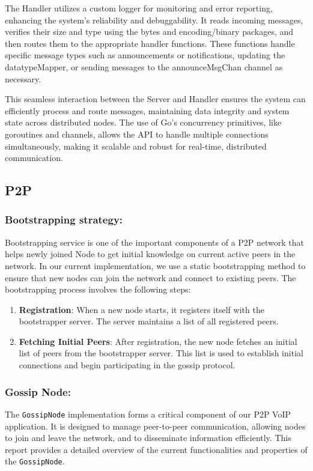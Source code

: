 The Handler utilizes a custom logger for monitoring and error reporting, enhancing the system's reliability and debuggability. It reads incoming messages, verifies their size and type using the bytes and encoding/binary packages, and then routes them to the appropriate handler functions. These functions handle specific message types such as announcements or notifications, updating the datatypeMapper, or sending messages to the announceMsgChan channel as necessary.

This seamless interaction between the Server and Handler ensures the system can efficiently process and route messages, maintaining data integrity and system state across distributed nodes. The use of Go's concurrency primitives, like goroutines and channels, allows the API to handle multiple connections simultaneously, making it scalable and robust for real-time, distributed communication.


\subsection{P2P}
\subsubsection{Bootstrapping strategy:}

Bootstrapping service is one of the important components of a P2P network that helps newly joined Node to get initial knowledge on current active peers in the network. 
In our current implementation, we use a static bootstrapping method to ensure that new nodes can join the network and connect to existing peers. The bootstrapping process involves the following steps:
\begin{enumerate}
    \item \textbf{Registration}: When a new node starts, it registers itself with the bootstrapper server. The server maintains a list of all registered peers.
    \item \textbf{Fetching Initial Peers}: After registration, the new node fetches an initial list of peers from the bootstrapper server. This list is used to establish initial connections and begin participating in the gossip protocol.
\end{enumerate}

\subsubsection{Gossip Node:}


The \texttt{GossipNode} implementation forms a critical component of our P2P VoIP application. It is designed to manage peer-to-peer communication, allowing nodes to join and leave the network, and to disseminate information efficiently. This report provides a detailed overview of the current functionalities and properties of the \texttt{GossipNode}.


